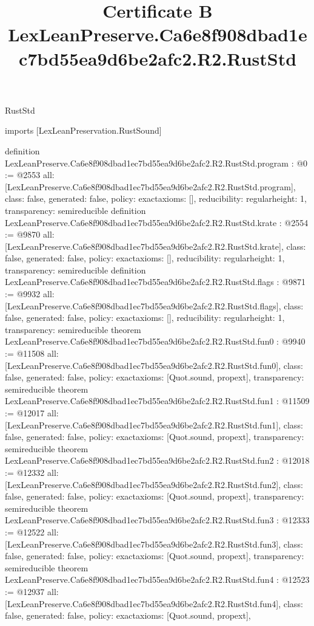 \begin{lexlean}{RustStd}
\title{Certificate B LexLeanPreserve.Ca6e8f908dbad1ec7bd55ea9d6be2afc2.R2.RustStd}
\begin{coremodule}
imports [LexLeanPreservation.RustSound]

definition LexLeanPreserve.Ca6e8f908dbad1ec7bd55ea9d6be2afc2.R2.RustStd.program : @0 := @2553 {
  all: [LexLeanPreserve.Ca6e8f908dbad1ec7bd55ea9d6be2afc2.R2.RustStd.program],
  class: false,
  generated: false,
  policy: exact{axioms: []},
  reducibility: regular{height: 1},
  transparency: semireducible
}
definition LexLeanPreserve.Ca6e8f908dbad1ec7bd55ea9d6be2afc2.R2.RustStd.krate : @2554 := @9870 {
  all: [LexLeanPreserve.Ca6e8f908dbad1ec7bd55ea9d6be2afc2.R2.RustStd.krate],
  class: false,
  generated: false,
  policy: exact{axioms: []},
  reducibility: regular{height: 1},
  transparency: semireducible
}
definition LexLeanPreserve.Ca6e8f908dbad1ec7bd55ea9d6be2afc2.R2.RustStd.flags : @9871 := @9932 {
  all: [LexLeanPreserve.Ca6e8f908dbad1ec7bd55ea9d6be2afc2.R2.RustStd.flags],
  class: false,
  generated: false,
  policy: exact{axioms: []},
  reducibility: regular{height: 1},
  transparency: semireducible
}
theorem LexLeanPreserve.Ca6e8f908dbad1ec7bd55ea9d6be2afc2.R2.RustStd.fun0 : @9940 := @11508 {
  all: [LexLeanPreserve.Ca6e8f908dbad1ec7bd55ea9d6be2afc2.R2.RustStd.fun0],
  class: false,
  generated: false,
  policy: exact{axioms: [Quot.sound, propext]},
  transparency: semireducible
}
theorem LexLeanPreserve.Ca6e8f908dbad1ec7bd55ea9d6be2afc2.R2.RustStd.fun1 : @11509 := @12017 {
  all: [LexLeanPreserve.Ca6e8f908dbad1ec7bd55ea9d6be2afc2.R2.RustStd.fun1],
  class: false,
  generated: false,
  policy: exact{axioms: [Quot.sound, propext]},
  transparency: semireducible
}
theorem LexLeanPreserve.Ca6e8f908dbad1ec7bd55ea9d6be2afc2.R2.RustStd.fun2 : @12018 := @12332 {
  all: [LexLeanPreserve.Ca6e8f908dbad1ec7bd55ea9d6be2afc2.R2.RustStd.fun2],
  class: false,
  generated: false,
  policy: exact{axioms: [Quot.sound, propext]},
  transparency: semireducible
}
theorem LexLeanPreserve.Ca6e8f908dbad1ec7bd55ea9d6be2afc2.R2.RustStd.fun3 : @12333 := @12522 {
  all: [LexLeanPreserve.Ca6e8f908dbad1ec7bd55ea9d6be2afc2.R2.RustStd.fun3],
  class: false,
  generated: false,
  policy: exact{axioms: [Quot.sound, propext]},
  transparency: semireducible
}
theorem LexLeanPreserve.Ca6e8f908dbad1ec7bd55ea9d6be2afc2.R2.RustStd.fun4 : @12523 := @12937 {
  all: [LexLeanPreserve.Ca6e8f908dbad1ec7bd55ea9d6be2afc2.R2.RustStd.fun4],
  class: false,
  generated: false,
  policy: exact{axioms: [Quot.sound, propext]},
}
\end{coremodule}
\end{lexlean}

